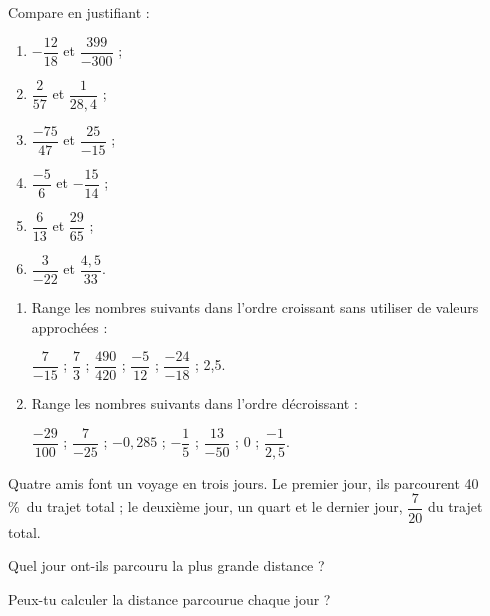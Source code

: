 \begin{exercice}
Compare en justifiant :
\begin{enumerate}
\item $-\dfrac{12}{18}$ et $\dfrac{399}{-300}$ ; 
\item $\dfrac{2}{57}$ et $\dfrac{1}{28,4}$ ;
\item $\dfrac{-75}{47}$ et $\dfrac{25}{-15}$ ;
\item $\dfrac{-5}{6}$ et $-\dfrac{15}{14}$ ;
\item $\dfrac{6}{13}$ et $\dfrac{29}{65}$ ;
\item $\dfrac{3}{-22}$ et $\dfrac{4,5}{33}$.
\end{enumerate}
\end{exercice}




\begin{exercice}
\begin{enumerate}
\item Range les nombres suivants dans l'ordre croissant sans utiliser de valeurs approchées :

$\dfrac{7}{-15}$ ; $\dfrac{7}{3}$ ; $\dfrac{490}{420}$ ; $\dfrac{-5}{12}$ ; $\dfrac{-24}{-18}$ ; 2,5.
\item Range les nombres suivants dans l'ordre décroissant :

$\dfrac{-29}{100}$ ; $\dfrac{7}{-25}$ ; $-0,285$ ; $-\dfrac{1}{5}$ ; $\dfrac{13}{-50}$ ; 0 ; $\dfrac{-1}{2,5}$.
\end{enumerate}
\end{exercice}





\begin{exercice}[Trajet]
Quatre amis font un voyage en trois jours. Le premier jour, ils parcourent 40\,\%\ du trajet total ; le deuxième jour, un quart et le dernier jour, $\dfrac{7}{20}$ du trajet total.

Quel jour ont-ils parcouru la plus grande distance ?

Peux-tu calculer la distance parcourue chaque jour ?
\end{exercice}












